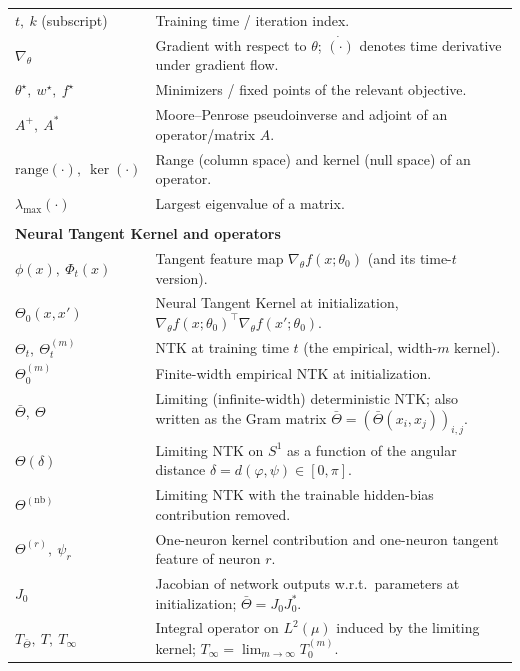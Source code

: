 \begin{longtable}{p{} p{}}
$t,\ k$ (subscript) & Training time / iteration index. \\[0.4em]
$\nabla_\theta$ & Gradient with respect to $\theta$; $\dot{(\cdot)}$ denotes time derivative under gradient flow. \\[0.4em]
$\theta^\star,\ w^\star,\ f^\star$ & Minimizers / fixed points of the relevant objective. \\[0.4em]
$A^{+},\ A^{\ast}$ & Moore--Penrose pseudoinverse and adjoint of an operator/matrix $A$. \\[0.4em]
$\mathrm{range}(\cdot),\ \ker(\cdot)$ & Range (column space) and kernel (null space) of an operator. \\[0.4em]
$\lambda_{\max}(\cdot)$ & Largest eigenvalue of a matrix. \\[0.6em]

\\
\multicolumn{2}{l}{\textbf{Neural Tangent Kernel and operators}}\\[0.3em]
$\phi(x),\ \Phi_t(x)$ & Tangent feature map $\nabla_\theta f(x;\theta_0)$ (and its time-$t$ version). \\[0.4em]
$\Theta_0(x,x')$ & Neural Tangent Kernel at initialization, $\nabla_\theta f(x;\theta_0)^\top\nabla_\theta f(x';\theta_0)$. \\[0.4em]
$\Theta_t,\ \Theta_t^{(m)}$ & NTK at training time $t$ (the empirical, width-$m$ kernel). \\[0.4em]
$\Theta_0^{(m)}$ & Finite-width empirical NTK at initialization. \\[0.4em]
$\bar\Theta,\ \Theta$ & Limiting (infinite-width) deterministic NTK; also written as the Gram matrix $\bar\Theta=(\bar\Theta(x_i,x_j))_{i,j}$. \\[0.4em]
$\Theta(\delta)$ & Limiting NTK on $S^1$ as a function of the angular distance $\delta=d(\varphi,\psi)\in[0,\pi]$. \\[0.4em]
$\Theta^{(\mathrm{nb})}$ & Limiting NTK with the trainable hidden-bias contribution removed. \\[0.4em]
$\Theta^{(r)},\ \psi_r$ & One-neuron kernel contribution and one-neuron tangent feature of neuron $r$. \\[0.4em]
$J_0$ & Jacobian of network outputs w.r.t.\ parameters at initialization; $\bar\Theta=J_0 J_0^\ast$. \\[0.4em]
$T_{\bar\Theta},\ T,\ T_\infty$ & Integral operator on $L^2(\mu)$ induced by the limiting kernel; $T_\infty=\lim_{m\to\infty}T_0^{(m)}$. \\[0.4em]

\end{longtable}
